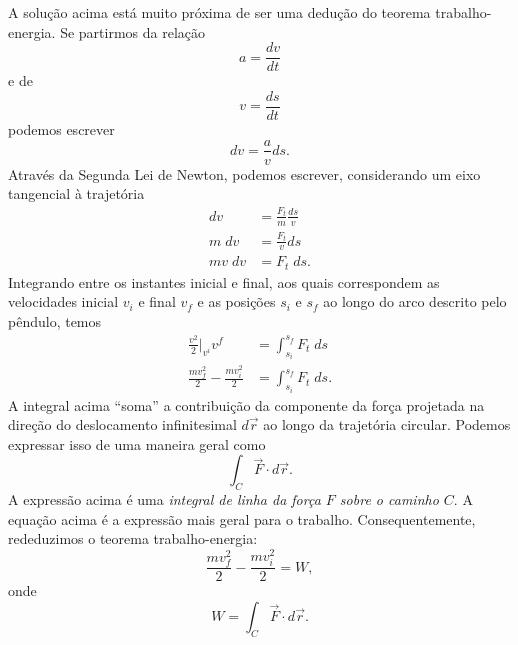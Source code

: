 A solução acima está muito próxima de ser uma dedução do teorema trabalho-energia. Se partirmos da relação
\begin{equation}
    a = \frac{dv}{dt}
\end{equation}
%
e de
\begin{equation}
    v = \frac{ds}{dt}
\end{equation}
%
podemos escrever
\begin{equation}
    dv = \frac{a}{v} ds.
\end{equation}
%
Através da Segunda Lei de Newton, podemos escrever, considerando um eixo tangencial à trajetória
\begin{align}
    dv &= \frac{F_t}{m} \frac{ds}{v} \\
    m \; dv &= \frac{F_t}{v} ds \\
    mv \; dv &= F_t \; ds.
\end{align}
%
Integrando entre os instantes inicial e final, aos quais correspondem as velocidades inicial $v_i$ e final $v_f$ e as posições $s_i$ e $s_f$ ao longo do arco descrito pelo pêndulo, temos
\begin{align}
    \frac{v^2}{2}\Big|_{v^i}{v^f} &= \int_{s_i}^{s_f} F_t \; ds \\
    \frac{mv_f^2}{2} - \frac{mv_i^2}{2} &= \int_{s_i}^{s_f} F_t \; ds.
\end{align}
%
A integral acima ``soma'' a contribuição da componente da força projetada na direção do deslocamento infinitesimal $d\vec{r}$ ao longo da trajetória circular. Podemos expressar isso de uma maneira geral como
\begin{equation}
    \int_C \vec{F} \cdot d\vec{r}.
\end{equation}
%
A expressão acima é uma \emph{integral de linha da força $F$ sobre o caminho $C$}. A equação acima é a expressão mais geral para o trabalho. Consequentemente, rededuzimos o teorema trabalho-energia:
\begin{equation}
    \frac{mv_f^2}{2} - \frac{mv_i^2}{2} = W,
\end{equation}
%
onde
\begin{equation}
    W = \int_C \vec{F} \cdot d\vec{r}.
\end{equation}





